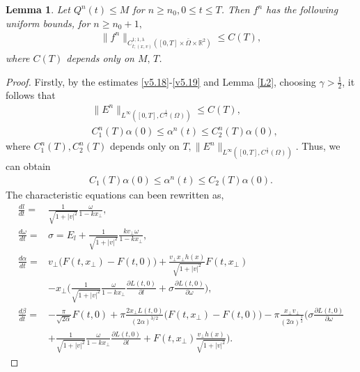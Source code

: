 \documentclass[11pt,reqno]{amsart}%
\newtheorem{Lemma}{Lemma}[section]
\theoremstyle{definition}
\theoremstyle{remark}
\begin{document}
\begin{Lemma}
Let $Q^{n}(t) \leq M$  for $n\geq n_{0}, 0\leq t\leq T$. Then $f^{n}$ has the following  uniform bounds, for $n\geq n_{0}+1,$
\begin{align}
\|f^{n}\|_{C^{1;1,\lambda}_{t;(x,v)}([0,T]\times \bar{\Omega}\times\mathbb{R}^{2})}\leq C(T), \label{v5.20}
\end{align}
where $C(T)$ depends only on $M,\,T$.
\end{Lemma}
\begin{proof}
Firstly,  %
by the estimates \eqref{v5.18}-\eqref{v5.19} and Lemma \ref{L2}, choosing $\gamma> \frac{1}{2}$, it follows that
\begin{align}
&\|E^{n}\|_{L^{\infty}([0,T],C^{\frac{1}{2}}(\Omega))}\leq C(T),\nonumber\\
&C_{1}^{n}(T)\alpha(0)\leq \alpha^{n}(t)\leq C_{2}^{n}(T)\alpha(0),\nonumber
\end{align}
where $C_{1}^{n}(T),C_{2}^{n}(T)$ depends only on $T,\|E^{n}\|_{L^{\infty}([0,T],C^{\frac{1}{2}}(\Omega))}$.
Thus, we can obtain
\begin{align}
C_{1}(T)\alpha(0)\leq \alpha^{n}(t)\leq C_{2}(T)\alpha(0). \label{v5.21}
\end{align}
 The characteristic equations can been rewritten as,
\begin{align}
\frac{d l}{d t}=&\frac{1}{\sqrt{1+|v|^{2}}}\frac{\omega}{1-kx_{\bot}},\nonumber\\
\frac{d \omega}{d t}=&\sigma=E_{l} +\frac{1}{\sqrt{1+|v|^{2}}}\frac{k v_{\bot}\omega}{1-kx_{\bot}},\nonumber\\
\frac{d \alpha}{d t}=&v_{\bot}\Big(F(t,x_{\bot})-F(t,0)\Big)
  +\frac{v_{\bot}x_{\bot}h(x)}{\sqrt{1+|v|^{2}}}F(t,x_{\bot})\nonumber\\
  &-x_{\bot}\Big(\frac{1}{\sqrt{1+|v|^{2}}}\frac{\omega}{1-kx_{\bot}}\frac{\partial L(t,0)}{\partial l}+\sigma \frac{\partial L(t,0)}{\partial \omega}\Big),\nonumber\\
\frac{d \beta }{d t}=&-\frac{\pi}{\sqrt{2\alpha}}F(t,0)+\pi\frac{2x_{\bot}L(t,0)}{(2\alpha)^{3/2}}\Big(F(t,x_{\bot})-F(t,0)\Big)-\pi \frac{x_{\bot}v_{\bot}}{(2\alpha)^{\frac{3}{2}}}
 \Big(\sigma \frac{\partial L(t,0)}{\partial\omega}\nonumber\\
   &+\frac{1}{\sqrt{1+|v|^{2}}}\frac{\omega}{1-k x_{\bot}}
  \frac{\partial L(t,0)}{\partial l}+F(t,x_{\bot})\frac{v_{\bot}h(x)}{\sqrt{1+|v|^{2}}}\Big).\nonumber
\end{align}

\end{proof}
\end{document}

